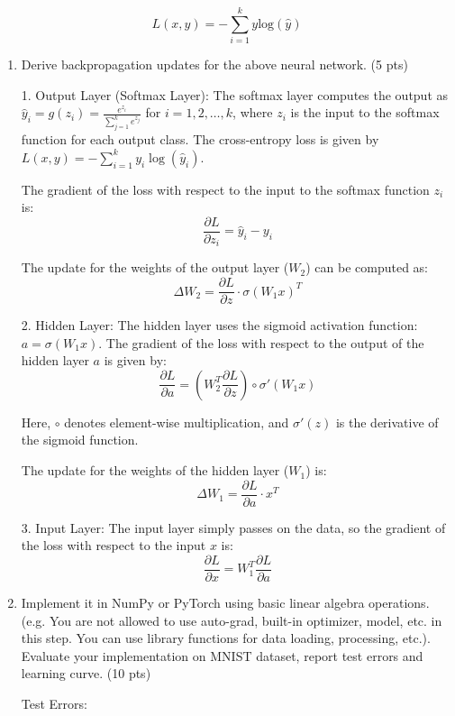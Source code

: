 \documentclass[a4paper]{article}
\theoremstyle{definition}
\newenvironment{soln}{
    \leavevmode\color{blue}\ignorespaces
}{}
\begin{document}
\[
L(x, y) = -\sum_{i=1}^k y \text{log}(\hat{y})
\]

\begin{enumerate}
    \item Derive backpropagation updates for the above neural network. (5 pts) \\
    \begin{soln}
        1. Output Layer (Softmax Layer):
            The softmax layer computes the output as \(\hat{y}_i = g(z_i) = \frac{e^{z_i}}{\sum_{j=1}^k e^{z_j}}\) for \(i = 1, 2, \ldots, k\), where \(z_i\) is the input to the softmax function for each output class. The cross-entropy loss is given by \(L(x, y) = -\sum_{i=1}^k y_i \log(\hat{y}_i)\).

            The gradient of the loss with respect to the input to the softmax function \(z_i\) is:
            \[ \frac{\partial L}{\partial z_i} = \hat{y}_i - y_i \]

            The update for the weights of the output layer (\(W_2\)) can be computed as:
            \[ \Delta W_2 = \frac{\partial L}{\partial z} \cdot \sigma(W_1 x)^T \]

        2. Hidden Layer:
            The hidden layer uses the sigmoid activation function: \(a = \sigma(W_1 x)\). The gradient of the loss with respect to the output of the hidden layer \(a\) is given by:
            \[ \frac{\partial L}{\partial a} = (W_2^T \frac{\partial L}{\partial z}) \circ \sigma'(W_1 x) \]

            Here, \(\circ\) denotes element-wise multiplication, and \(\sigma'(z)\) is the derivative of the sigmoid function.

            The update for the weights of the hidden layer (\(W_1\)) is:
            \[ \Delta W_1 = \frac{\partial L}{\partial a} \cdot x^T \]

        3. Input Layer:
            The input layer simply passes on the data, so the gradient of the loss with respect to the input \(x\) is:
            \[ \frac{\partial L}{\partial x} = W_1^T \frac{\partial L}{\partial a} \]

    \end{soln}
    \item Implement it in NumPy or PyTorch using basic linear algebra operations. (e.g. You are not allowed to use auto-grad, built-in optimizer, model, etc. in this step. You can use library functions for data loading, processing, etc.). Evaluate your implementation on MNIST dataset, report test errors and learning curve. (10 pts)
    \begin{soln}
        Test Errors:



\end{soln}
\end{enumerate}
\end{document}
